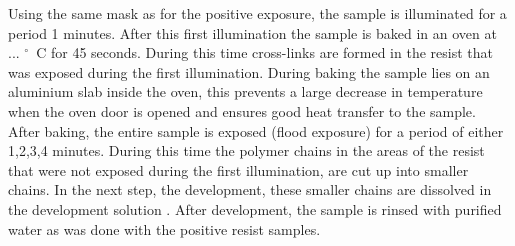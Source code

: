 Using the same mask as for the positive exposure, the sample is illuminated for a period 1  minutes. After this first illumination the sample is baked in an oven at ...  $^\circ$~C for 45 seconds. During this time cross-links are formed in the resist that was exposed during the first illumination. During baking the sample lies on an aluminium slab inside the oven, this prevents a large decrease in temperature when the oven door is opened and ensures good heat transfer to the sample. After baking, the entire sample is exposed (flood exposure) for a period of either 1,2,3,4  minutes. During this time the polymer chains in the areas of the resist that were not exposed during the first illumination, are cut up into smaller chains. In the next step, the development, these smaller chains are dissolved in the development solution . After development, the sample is rinsed with purified water as was done with the positive resist samples.
